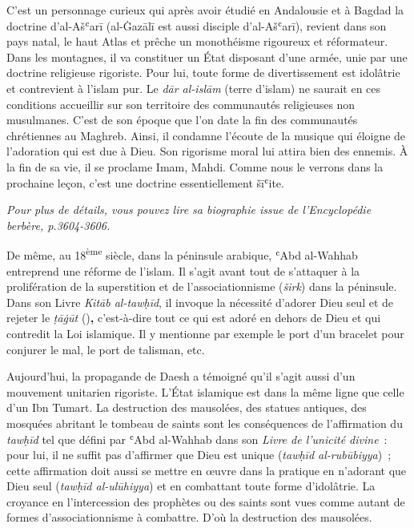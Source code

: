 C'est un personnage curieux qui après
avoir étudié en Andalousie et à Bagdad la doctrine d'al-Ašʿarī
(al-Ġazālī est aussi disciple d'al-Ašʿarī), revient dans son pays natal,
le haut Atlas et prêche un monothéisme rigoureux et réformateur. Dans
les montagnes, il va constituer un État disposant d'une armée, unie par
une doctrine religieuse rigoriste. Pour lui, toute forme de
divertissement est idolâtrie et contrevient à l'islam pur. Le \emph{dār
al-islām} (terre d'islam) ne saurait en ces conditions accueillir sur
son territoire des communautés religieuses non musulmanes. C'est de son
époque que l'on date la fin des communautés chrétiennes au Maghreb.
Ainsi, il condamne l'écoute de la musique qui éloigne de l'adoration qui
est due à Dieu. Son rigorisme moral lui attira bien des ennemis. À la
fin de sa vie, il se proclame Imam, Mahdi. Comme nous le verrons dans la
prochaine leçon, c'est une doctrine essentiellement šīʿite.



\textit{{Pour plus de détails, vous pouvez lire sa
biographie issue de \emph{l'Encyclopédie berbère}, p.3604-3606.
}}
 

De même, au 18\textsuperscript{ème} siècle, dans la péninsule arabique,
ʿAbd al-Wahhab entreprend une réforme de l'islam. Il s'agit avant tout
de s'attaquer à la prolifération de la superstition et de
l'associationnisme (\emph{širk}) dans la péninsule. Dans son Livre
\emph{Kitāb al-tawḥīd}, il invoque la nécessité d'adorer Dieu seul et de
rejeter le \emph{ṭāġūt} (\textbf{})\textbf{,} c'est-à-dire
tout ce qui est adoré en dehors de Dieu et qui contredit la Loi
islamique. Il y mentionne par exemple le port d'un bracelet pour
conjurer le mal, le port de talisman, etc.

Aujourd'hui, la propagande de Daesh a témoigné qu'il s'agit aussi d'un
mouvement unitarien rigoriste. L'État islamique est dans la même ligne
que celle d'un Ibn Tumart. La destruction des mausolées, des statues
antiques, des mosquées abritant le tombeau de saints sont les
conséquences de l'affirmation du \emph{tawḥīd} tel que défini par ʿAbd
al-Wahhab dans son \emph{Livre de l'unicité divine}~: pour lui, il ne
suffit pas d'affirmer que Dieu est unique (\emph{tawḥīd al-rubūbiyya})~;
cette affirmation doit aussi se mettre en œuvre dans la pratique en
n'adorant que Dieu seul (\emph{tawḥīd al-ulūhiyya}) et en combattant
toute forme d'idolâtrie. La croyance en l'intercession des prophètes ou
des saints sont vues comme autant de formes d'associationnisme à
combattre. D'où la destruction des mausolées.

